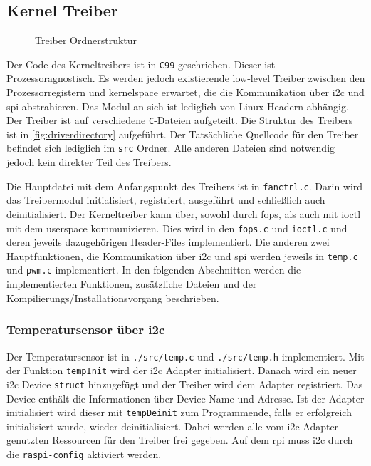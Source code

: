 \subsection{Kernel Treiber}

\begin{wrapfigure}{o}[1cm]{7cm}
\caption{Treiber Ordnerstruktur}
\label{fig:driverdirectory}
\end{wrapfigure}

Der Code des Kerneltreibers ist in \texttt{C99} geschrieben.
Dieser ist Prozessoragnostisch.
Es werden jedoch existierende low-level Treiber zwischen den Prozessorregistern und \gls{kernelspace} erwartet, die die Kommunikation über \gls{i2c} und \gls{spi} abstrahieren.
Das Modul an sich ist lediglich von Linux-Headern abhängig.
Der Treiber ist auf verschiedene \texttt{C}-Dateien aufgeteilt.
Die Struktur des Treibers ist in \autoref{fig:driverdirectory} aufgeführt.
Der Tatsächliche Quellcode für den Treiber befindet sich lediglich im \texttt{src} Ordner.
Alle anderen Dateien sind notwendig jedoch kein direkter Teil des Treibers.

Die Hauptdatei mit dem Anfangspunkt des Treibers ist in \texttt{fanctrl.c}.
Darin wird das Treibermodul initialisiert, registriert, ausgeführt und schließlich auch deinitialisiert.
Der Kerneltreiber kann über, sowohl durch \gls{fops}, als auch mit \gls{ioctl} mit dem \gls{userspace} kommunizieren.
Dies wird in den \texttt{fops.c} und \texttt{ioctl.c} und deren jeweils dazugehörigen Header-Files implementiert.
Die anderen zwei Hauptfunktionen, die Kommunikation über \gls{i2c} und \gls{spi} werden jeweils in \texttt{temp.c} und \texttt{pwm.c} implementiert.
In den folgenden Abschnitten werden die implementierten Funktionen, zusätzliche Dateien und der Kompilierungs/Installationsvorgang beschrieben.

\subsubsection{Temperatursensor über \acrshort{i2c}}

Der Temperatursensor ist in \texttt{./src/temp.c} und \texttt{./src/temp.h} implementiert.
Mit der Funktion \texttt{tempInit} wird der \gls{i2c} Adapter initialisiert.
Danach wird ein neuer \gls{i2c} Device \texttt{struct} hinzugefügt und der Treiber wird dem Adapter registriert.
Das Device enthält die Informationen über Device Name und Adresse.
Ist der Adapter initialisiert wird dieser mit \texttt{tempDeinit} zum Programmende, falls er erfolgreich initialisiert wurde, wieder deinitialisiert.
Dabei werden alle vom \gls{i2c} Adapter genutzten Ressourcen für den Treiber frei gegeben.
Auf dem \gls{rpi} muss \gls{i2c} durch die \texttt{raspi-config} aktiviert werden.

